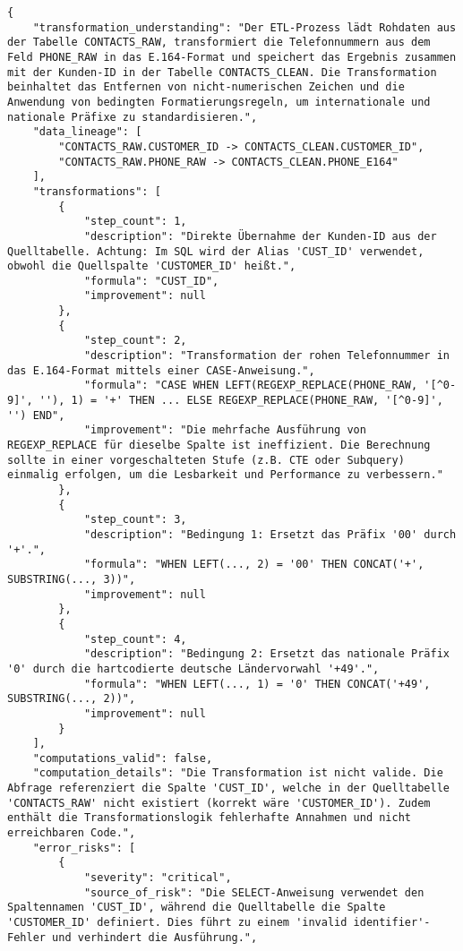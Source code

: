 \begin{lstlisting}[caption={Ausgabe: GEMINI 2.5 Pro Anwendungsfall 3 Hauptdurchlauf},label={gemini_case3_prompt1}]
{
    "transformation_understanding": "Der ETL-Prozess lädt Rohdaten aus der Tabelle CONTACTS_RAW, transformiert die Telefonnummern aus dem Feld PHONE_RAW in das E.164-Format und speichert das Ergebnis zusammen mit der Kunden-ID in der Tabelle CONTACTS_CLEAN. Die Transformation beinhaltet das Entfernen von nicht-numerischen Zeichen und die Anwendung von bedingten Formatierungsregeln, um internationale und nationale Präfixe zu standardisieren.",
    "data_lineage": [
        "CONTACTS_RAW.CUSTOMER_ID -> CONTACTS_CLEAN.CUSTOMER_ID",
        "CONTACTS_RAW.PHONE_RAW -> CONTACTS_CLEAN.PHONE_E164"
    ],
    "transformations": [
        {
            "step_count": 1,
            "description": "Direkte Übernahme der Kunden-ID aus der Quelltabelle. Achtung: Im SQL wird der Alias 'CUST_ID' verwendet, obwohl die Quellspalte 'CUSTOMER_ID' heißt.",
            "formula": "CUST_ID",
            "improvement": null
        },
        {
            "step_count": 2,
            "description": "Transformation der rohen Telefonnummer in das E.164-Format mittels einer CASE-Anweisung.",
            "formula": "CASE WHEN LEFT(REGEXP_REPLACE(PHONE_RAW, '[^0-9]', ''), 1) = '+' THEN ... ELSE REGEXP_REPLACE(PHONE_RAW, '[^0-9]', '') END",
            "improvement": "Die mehrfache Ausführung von REGEXP_REPLACE für dieselbe Spalte ist ineffizient. Die Berechnung sollte in einer vorgeschalteten Stufe (z.B. CTE oder Subquery) einmalig erfolgen, um die Lesbarkeit und Performance zu verbessern."
        },
        {
            "step_count": 3,
            "description": "Bedingung 1: Ersetzt das Präfix '00' durch '+'.",
            "formula": "WHEN LEFT(..., 2) = '00' THEN CONCAT('+', SUBSTRING(..., 3))",
            "improvement": null
        },
        {
            "step_count": 4,
            "description": "Bedingung 2: Ersetzt das nationale Präfix '0' durch die hartcodierte deutsche Ländervorwahl '+49'.",
            "formula": "WHEN LEFT(..., 1) = '0' THEN CONCAT('+49', SUBSTRING(..., 2))",
            "improvement": null
        }
    ],
    "computations_valid": false,
    "computation_details": "Die Transformation ist nicht valide. Die Abfrage referenziert die Spalte 'CUST_ID', welche in der Quelltabelle 'CONTACTS_RAW' nicht existiert (korrekt wäre 'CUSTOMER_ID'). Zudem enthält die Transformationslogik fehlerhafte Annahmen und nicht erreichbaren Code.",
    "error_risks": [
        {
            "severity": "critical",
            "source_of_risk": "Die SELECT-Anweisung verwendet den Spaltennamen 'CUST_ID', während die Quelltabelle die Spalte 'CUSTOMER_ID' definiert. Dies führt zu einem 'invalid identifier'-Fehler und verhindert die Ausführung.",

\end{lstlisting}
